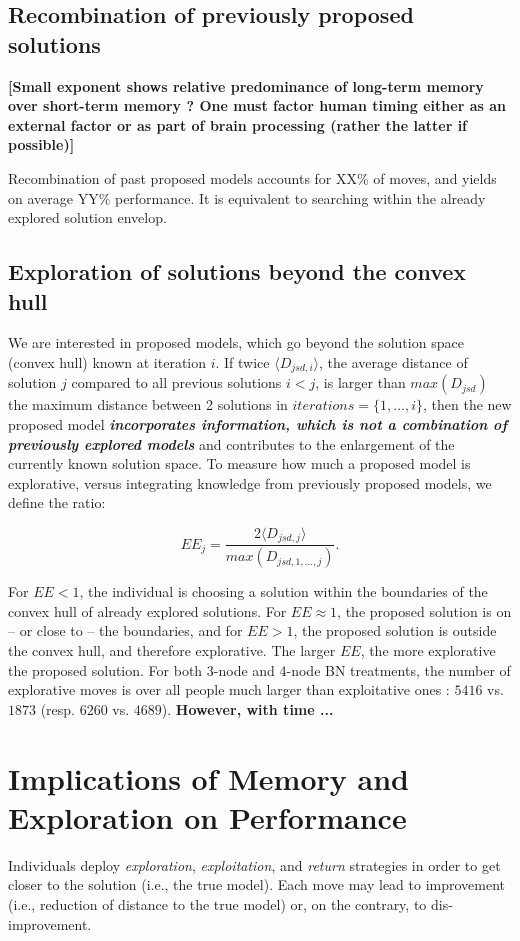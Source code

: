 \subsection{Recombination of previously proposed solutions}

{\bf [Small exponent shows relative predominance of long-term memory over short-term memory ? One must factor human timing either as an external factor or as part of brain processing (rather the latter if possible)]}

Recombination of past proposed models accounts for XX\% of moves, and yields on average  YY\% performance. It is equivalent to searching within the already explored solution envelop.


\subsection{Exploration of solutions beyond the convex hull}
We are interested in proposed models, which go beyond the solution space (convex hull) known at iteration $i$. If twice $\langle D_{jsd,i} \rangle$, the average distance of solution $j$ compared to all previous solutions $i < j$, is larger than $ max(D_{jsd})$ the maximum distance between 2 solutions in $iterations = \{1,...,i\}$, then the new proposed model {\it {\bf incorporates information, which is not a combination of previously explored models}} and contributes to the enlargement of the currently known solution space. To measure how much a proposed model is explorative, versus integrating knowledge from previously proposed models, we define the ratio:

\begin{equation}
EE_{j} = \frac{2 \langle D_{jsd,j} \rangle}{max(D_{jsd,1,...,j})}.
\end{equation}

For $EE < 1$, the individual is choosing a solution within the boundaries of the convex hull of already explored solutions. For $EE \approx 1$, the proposed solution is on -- or close to -- the boundaries, and for $EE > 1$, the proposed solution is outside the convex hull, and therefore explorative. The larger $EE$, the more explorative the proposed solution. For both 3-node and 4-node BN treatments,  the number of explorative moves is over all people much larger than exploitative ones :  $5416$ vs. $1873$ (resp. $6260$ vs. $4689$). {\bf However, with time ...}



\section{Implications of Memory and Exploration on Performance}
Individuals deploy {\it exploration}, {\it exploitation}, and {\it return} strategies in order to get closer to the solution (i.e., the true model). Each move may lead to improvement (i.e., reduction of distance to the true model) or, on the contrary, to dis-improvement. 

